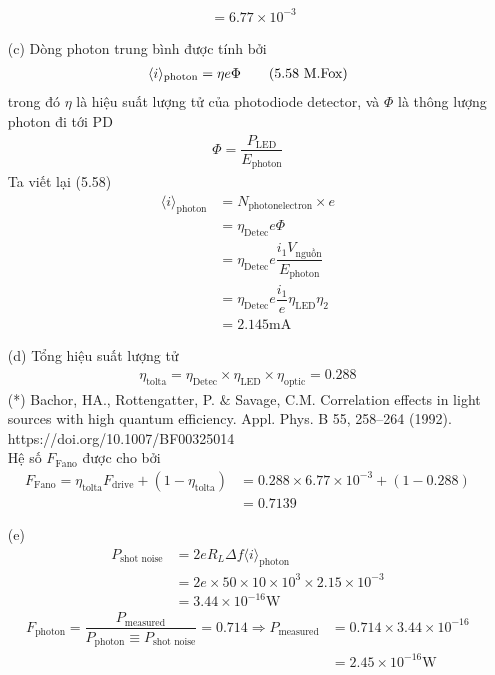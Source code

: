 \documentclass{article}
\newcommand{\f}[2]{\dfrac{#1}{#2}}
\begin{document}
\begin{enumerate}
\begin{align*}
		       & = 6.77 \times 10^{-3}
	      \end{align*}
	\item[(c)] Dòng photon trung bình được tính bởi
	      \begin{align*}
		      \langle i \rangle_{\text{photon}} = \eta e \Phi \tag{5.58 \text{M.Fox}}
	      \end{align*}
	      trong đó $\eta$ là hiệu suất lượng tử của photodiode detector, và $\Phi$ là thông lượng photon đi tới PD\\
	      \begin{align*}
		      \Phi = \f{P_{\text{LED}}}{E_{\text{photon}}}
	      \end{align*}
	      Ta viết lại (5.58)
	      \begin{align*}
		      \langle i \rangle_{\text{photon}}
		       & = N_{\text{photonelectron}} \times e                                  \\
		       & = \eta_{\text{Detec}} e \Phi                                          \\
		       & = \eta_{\text{Detec}} e \f{i_{1} V_{\text{nguồn}}}{E_{\text{photon}}} \\
		       & = \eta_{\text{Detec}} e \f{i_{1}}{e} \eta_{\text{LED}} \eta_{2}       \\
		       & = 2.145 \text{mA}
	      \end{align*}
	\item[(d)] Tổng hiệu suất lượng tử
	      \begin{align*}
		      \eta_{\text{tolta}} = \eta_{\text{Detec}} \times \eta_{\text{LED}} \times \eta_{\text{optic}} = 0.288  \tag{*}
	      \end{align*}
	      (*) Bachor, HA., Rottengatter, P. $\&$ Savage, C.M. Correlation effects in light sources with high quantum efficiency. Appl. Phys. B 55, 258–264 (1992).\\ https://doi.org/10.1007/BF00325014 \\
	      Hệ số $F_{\text{Fano}}$ được cho bởi
	      \begin{align*}
		      F_{\text{Fano}} = \eta_{\text{tolta}} F_{\text{drive}} + (1 - \eta_{\text{tolta}})
		       & = 0.288 \times 6.77 \times 10^{-3} + (1 - 0.288) \\
		       & = 0.7139
	      \end{align*}
	\item[(e)]
	      \begin{align*}
		      P_{\text{shot noise}}
		       & = 2 e R_{L} \Delta f \langle i \rangle_{\text{photon}}            \\
		       & = 2e \times 50 \times 10 \times 10^{3} \times 2.15 \times 10^{-3} \\
		       & = 3.44 \times 10^{-16} \text{W} \tag{1}
	      \end{align*}
	      \begin{align*}
		      F_{\text{photon}} = \f{P_\text{measured}}{P_{\text{photon}} \equiv P_{\text{shot noise}} } = 0.714 \Rightarrow P_\text{measured}
		       & = 0.714 \times 3.44 \times 10^{-16} \\
		       & = 2.45 \times 10^{-16} \text{W}
	      \end{align*}
\end{enumerate}
\end{document}
